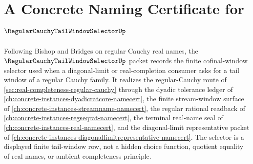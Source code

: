 \chapter{A Concrete Naming Certificate for $\RegularCauchyTailWindowSelectorUp$}
\label{ch:concrete-instances-regular-cauchy-tail-window-selector-namecert}

Following Bishop and Bridges on regular Cauchy real names, the $\RegularCauchyTailWindowSelectorUp$ packet records the finite cofinal-window selector used when a diagonal-limit or real-completion consumer asks for a tail window of a regular Cauchy family. It realizes the regular-Cauchy route of \autoref{sec:real-completeness-regular-cauchy} through the dyadic tolerance ledger of \autoref{ch:concrete-instances-dyadicratcore-namecert}, the finite stream-window surface of \autoref{ch:concrete-instances-streamname-namecert}, the regular rational readback of \autoref{ch:concrete-instances-regseqrat-namecert}, the terminal real-name seal of \autoref{ch:concrete-instances-real-namecert}, and the diagonal-limit representative packet of \autoref{ch:concrete-instances-diagonallimitrepresentative-namecert}. The selector is a displayed finite tail-window row, not a hidden choice function, quotient equality of real names, or ambient completeness principle.


